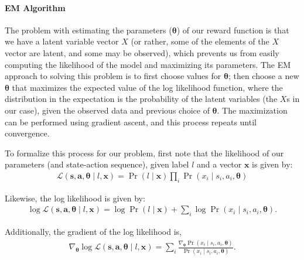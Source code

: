 
\paragraph{EM Algorithm}

The problem with estimating the parameters ($\bm{\theta}$) of our
reward function is that we have a latent variable vector $X$ (or
rather, some of the elements of the $X$ vector are latent, and some
may be observed), which prevents us from easily computing the
likelihood of the model and maximizing its parameters.  The EM
approach to solving this problem is to first choose values for
$\bm{\theta}$; then choose a new $\bm{\theta}$ that maximizes the
expected value of the log likelihood function, where the distribution
in the expectation is the probability of the latent variables (the
$X$s in our case), given the observed data and previous choice of
$\bm{\theta}$. The maximization can be performed using gradient
ascent, and this process repeats until convergence.

To formalize this process for our problem, first note that the
likelihood of our parameters (and state-action sequence), given label
$l$ and a vector $\bm{x}$ is given by:
%
%
\begin{align}
\mathcal{L}(\bm{s}, \bm{a}, \bm{\theta} \mid l, \bm{x}) 
= \Pr(l \mid \bm{x}) \prod_i \Pr(x_i \mid s_i, a_i, \bm{\theta})
\end{align}

\noindent
Likewise, the log likelihood is given by:
%
\begin{align}
\log\mathcal{L}(\bm{s}, \bm{a}, \bm{\theta} \mid l, \bm{x}) = 
\log \Pr(l \mid \bm{x}) + \sum_i \log \Pr(x_i \mid s_i, a_i, \bm{\theta}).
\end{align}

\noindent
Additionally, the gradient of the log likelihood is,
%
\begin{align}
\nabla_{\bm{\theta}} \log\mathcal{L}(\bm{s}, \bm{a}, \bm{\theta} \mid l, \bm{x}) = \sum_i  \frac{\nabla_{\bm{\theta}} \Pr(x_i \mid s_i, a_i, \bm{\theta})}{\Pr(x_i \mid s_i, a_i, \bm{\theta})}.
\end{align}

